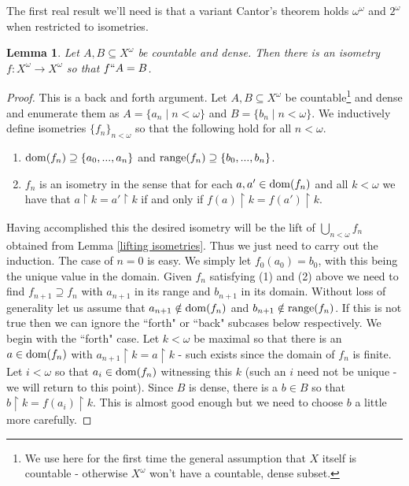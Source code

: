 \documentclass[leqno,11pt]{amsart}
\newtheorem{lemma}[theorem]{Lemma}
\theoremstyle{definition}
\theoremstyle{remark}
\def\hook{\upharpoonright}
\def\baire{\omega^\omega}
\begin{document}
The first real result we'll need is that a variant Cantor's theorem holds $\baire$ and $2^\omega$ when restricted to isometries. 

\begin{lemma}
    Let $A, B \subseteq X^\omega$ be countable and dense. Then there is an isometry $f:X^\omega \to X^\omega$ so that $f``A = B$. %
    \label{CDHisom}
\end{lemma}

\begin{proof}
    This is a back and forth argument. Let $A, B \subseteq X^\omega$ be countable\footnote{We use here for the first time the general assumption that $X$ itself is countable - otherwise $X^\omega$ won't have a countable, dense subset.} and dense and enumerate them as $A = \{a_n\; | \; n < \omega\}$ and $B = \{b_n\; | \; n < \omega\}$. We inductively define isometries $\{f_n\}_{n < \omega}$ so that the following hold for all $n < \omega$.
    \begin{enumerate}
        \item ${\rm dom}({f_n}) \supseteq \{a_0, ..., a_n\}$ and ${\rm range}(f_n) \supseteq \{b_0, ..., b_n\}$.
        \item $f_n$ is an isometry in the sense that for each $a, a' \in {\rm dom}(f_n)$ and all $k < \omega$ we have that $a \hook k = a' \hook k$ if and only if $f(a) \hook k = f(a') \hook k$.
    \end{enumerate}

    Having accomplished this the desired isometry will be the lift of $\bigcup_{n < \omega} f_n$ obtained from Lemma \ref{lifting isometries}. Thus we just need to carry out the induction. The case of $n = 0$ is easy. We simply let $f_0 (a_0) = b_0$, with this being the unique value in the domain. Given $f_n$ satisfying (1) and (2) above we need to find $f_{n+1} \supseteq f_n$ with $a_{n+1}$ in its range and $b_{n+1}$ in its domain. Without loss of generality let us assume that $a_{n+1} \notin {\rm dom}(f_n)$ and $b_{n+1} \notin {\rm range}(f_n)$. If this is not true then we can ignore the ``forth" or ``back" subcases below respectively. We begin with the ``forth" case. Let $k < \omega$ be maximal so that there is an $a \in {\rm dom}(f_n)$ with $a_{n+1} \hook k = a \hook k$ - such exists since the domain of $f_n$ is finite. Let $i < \omega$ so that $a_i \in {\rm dom}(f_n)$ witnessing this $k$ (such an $i$ need not be unique - we will return to this point). Since $B$ is dense, there is a $b \in B$ so that $b \hook k = f(a_i) \hook k$. This is almost good enough but we need to choose $b$ a little more carefully. 


\end{proof}
\end{document}
